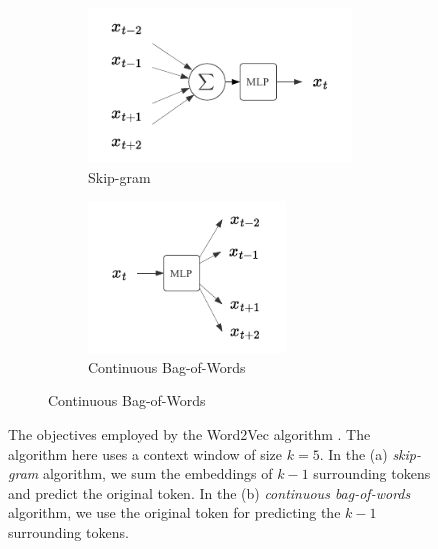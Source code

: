 {\begin{figure}[ht]
    \centering

    \begin{subfigure}{\textwidth}
        \centering
        \begin{subfigure}{0.45\textwidth}
            \centering
            \includegraphics[width=\textwidth]{img/skipgram.pdf}
            \caption{Skip-gram}
            \label{fig:skipgram}
        \end{subfigure}
        \hspace{-20px}
        \begin{subfigure}{0.45\textwidth}
            \centering
            \includegraphics[width=0.75\textwidth]{img/cbow.pdf}
            \caption{Continuous Bag-of-Words}
            \label{fig:cbow}
        \end{subfigure}
    \end{subfigure}
    \caption{The objectives employed by the Word2Vec algorithm \cite{mikolov2013distributed}. The algorithm here uses a context window of size $k=5$. In the (a) \emph{skip-gram} algorithm, we sum the embeddings of $k-1$ surrounding tokens and predict the original token. In the (b) \emph{continuous bag-of-words} algorithm, we use the original token for predicting the $k-1$ surrounding tokens.}
    \label{fig:word2vec}
\end{figure}

}
